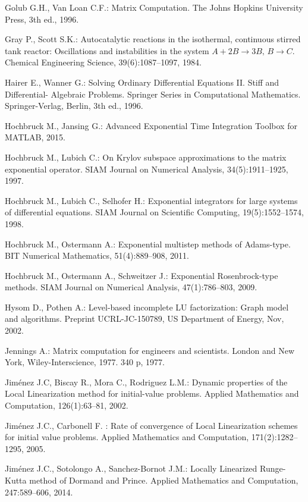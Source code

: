 \begin{thebibliography}{99}
 Golub G.H., Van Loan C.F.: Matrix Computation. The Johns Hopkins University Press, 3th ed., 1996.

 Gray P., Scott S.K.: Autocatalytic reactions in the isothermal, continuous stirred tank reactor:
Oscillations and instabilities in the system $A+2B\to 3B,\, B\to C$. Chemical Engineering Science,
39(6):1087–1097, 1984.

 Hairer E., Wanner G.: Solving Ordinary Differential Equations II. Stiff and Differential-
Algebraic Problems. Springer Series in Computational Mathematics. Springer-Verlag, Berlin,
3th ed., 1996.

 Hochbruck M., Jansing G.: Advanced Exponential Time Integration Toolbox for MATLAB, 2015.

 Hochbruck M., Lubich C.: On Krylov subspace approximations to the matrix exponential
operator. SIAM Journal on Numerical Analysis, 34(5):1911–1925, 1997.

 Hochbruck M., Lubich C., Selhofer H.: Exponential integrators for large systems
of differential equations. SIAM Journal on Scientific Computing, 19(5):1552–1574, 1998.

 Hochbruck M., Ostermann A.: Exponential multistep methods of Adams-type. BIT
Numerical Mathematics, 51(4):889–908, 2011.

 Hochbruck M., Ostermann A., Schweitzer J.: Exponential Rosenbrock-type methods.
SIAM Journal on Numerical Analysis, 47(1):786–803, 2009.

 Hysom D., Pothen A.: Level-based incomplete LU factorization: Graph model and algorithms.
Preprint UCRL-JC-150789, US Department of Energy, Nov, 2002.

 Jennings A.: Matrix computation for engineers and scientists. London and New York,
Wiley-Interscience, 1977. 340 p, 1977.

 Jiménez J.C, Biscay R., Mora C., Rodriguez L.M.: Dynamic properties of the
Local Linearization method for initial-value problems. Applied Mathematics and Computation,
126(1):63–81, 2002.

 Jiménez J.C., Carbonell F. : Rate of convergence of Local Linearization schemes for initial value
problems. Applied Mathematics and Computation, 171(2):1282–1295, 2005.

 Jiménez J.C., Sotolongo A., Sanchez-Bornot J.M.: Locally Linearized Runge-Kutta
method of Dormand and Prince. Applied Mathematics and Computation, 247:589–606, 2014.


\end{thebibliography}

